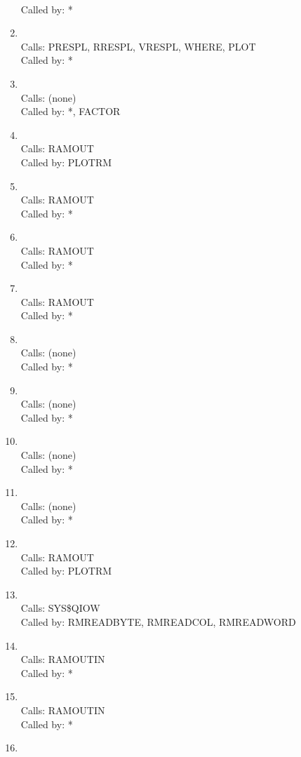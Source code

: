 \documentclass[11pt]{report}
\begin{document}
\begin{enumerate}
\\ Called by: *
\item {}
\\ Calls:  PRESPL, RRESPL, VRESPL, WHERE, PLOT
\\ Called by: *
\item {}
\\ Calls:  (none)
\\ Called by: *, FACTOR
\item {}
\\ Calls:  RAMOUT
\\ Called by: PLOTRM
\item {}
\\ Calls:  RAMOUT
\\ Called by: *
\item {}
\\ Calls:  RAMOUT
\\ Called by: *
\item {}
\\ Calls:  RAMOUT
\\ Called by: *
\item {}
\\ Calls:  (none)
\\ Called by: *
\item {}
\\ Calls:  (none)
\\ Called by: *
\item {}
\\ Calls:  (none)
\\ Called by: *
\item {}
\\ Calls:  (none)
\\ Called by: *
\item {}
\\ Calls:  RAMOUT
\\ Called by: PLOTRM
\item {}
\\ Calls: SYS\$QIOW
\\ Called by: RMREADBYTE, RMREADCOL, RMREADWORD
\item {}
\\ Calls: RAMOUTIN
\\ Called by: *
\item {}
\\ Calls: RAMOUTIN
\\ Called by: *
\item {}

\end{enumerate}
\end{document}
